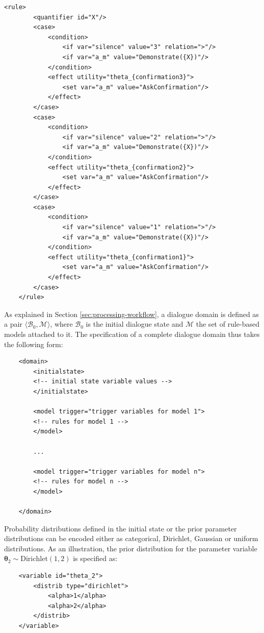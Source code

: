 \begin{lstlisting}[label=listing:xml2,caption=Example of utility rule in XML format, float=p,captionpos=b]
    <rule>
        <quantifier id="X"/>
        <case>
            <condition>
                <if var="silence" value="3" relation=">"/>
                <if var="a_m" value="Demonstrate({X})"/>
            </condition>
            <effect utility="theta_{confirmation3}">
                <set var="a_m" value="AskConfirmation"/>
            </effect>
        </case>
        <case>
            <condition>
                <if var="silence" value="2" relation=">"/>
                <if var="a_m" value="Demonstrate({X})"/>
            </condition>
            <effect utility="theta_{confirmation2}">
                <set var="a_m" value="AskConfirmation"/>
            </effect>
        </case>
        <case>
            <condition>
                <if var="silence" value="1" relation=">"/>
                <if var="a_m" value="Demonstrate({X})"/>
            </condition>
            <effect utility="theta_{confirmation1}">
                <set var="a_m" value="AskConfirmation"/>
            </effect>
        </case>
    </rule>
\end{lstlisting}

As explained in Section \ref{sec:processing-workflow}, a dialogue domain is defined as a pair $\langle \mathcal{B}_0, \mathcal{M} \rangle$, where $\mathcal{B}_0$ is the initial dialogue state  and $\mathcal{M}$ the set of rule-based models attached to it. The specification of a complete dialogue domain thus takes the following form:
\begin{lstlisting}
    <domain> 
        <initialstate>
		<!-- initial state variable values -->
        </initialstate>

        <model trigger="trigger variables for model 1">
   		<!-- rules for model 1 -->
     	</model>
     	
     	...
     	
     	<model trigger="trigger variables for model n">
   		<!-- rules for model n -->
     	</model>

    </domain>
\end{lstlisting}

Probability distributions defined in the initial state or the prior parameter distributions can be encoded either as categorical, Dirichlet, Gaussian or uniform distributions.  As an illustration, the prior distribution for the parameter variable $\boldsymbol\theta_2 \sim \mathrm{Dirichlet}(1,2)$ is specified as:
\begin{lstlisting}
    <variable id="theta_2">
        <distrib type="dirichlet">
            <alpha>1</alpha>
            <alpha>2</alpha>
        </distrib>
    </variable>
\end{lstlisting}

